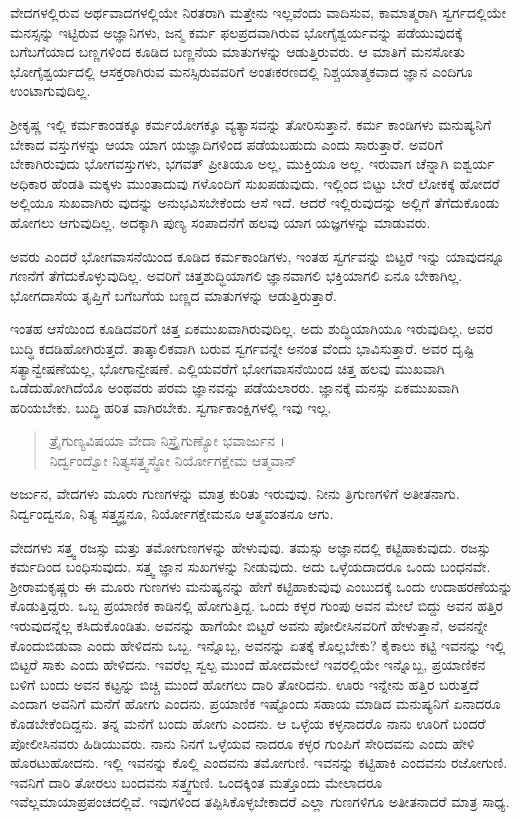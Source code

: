 {\small ವೇದಗಳಲ್ಲಿರುವ ಅರ್ಥವಾದಗಳಲ್ಲಿಯೇ ನಿರತರಾಗಿ ಮತ್ತೇನು ಇಲ್ಲವೆಂದು ವಾದಿಸುವ, ಕಾಮಾತ್ಮರಾಗಿ ಸ್ವರ್ಗದಲ್ಲಿಯೇ ಮನಸ್ಸನ್ನು ಇಟ್ಟಿರುವ ಅಜ್ಞಾನಿಗಳು, ಜನ್ಮ ಕರ್ಮ ಫಲಪ್ರದವಾಗಿರುವ ಭೋಗೈಶ್ವರ್ಯವನ್ನು ಪಡೆಯುವುದಕ್ಕೆ ಬಗೆಬಗೆಯಾದ ಬಣ್ಣಗಳಿಂದ ಕೂಡಿದ ಬಣ್ಣನೆಯ ಮಾತುಗಳನ್ನು ಆಡುತ್ತಿರುವರು. ಆ ಮಾತಿಗೆ ಮನಸೋತು ಭೋಗೈಶ್ವರ್ಯದಲ್ಲಿ ಆಸಕ್ತರಾಗಿರುವ ಮನಸ್ಸಿರುವವರಿಗೆ ಅಂತಃಕರಣದಲ್ಲಿ ನಿಶ್ಚಯಾತ್ಮಕವಾದ ಜ್ಞಾನ ಎಂದಿಗೂ ಉಂಟಾಗುವುದಿಲ್ಲ.}

ಶ್ರೀಕೃಷ್ಣ ಇಲ್ಲಿ ಕರ್ಮಕಾಂಡಕ್ಕೂ ಕರ್ಮಯೋಗಕ್ಕೂ ವ್ಯತ್ಯಾಸವನ್ನು ತೋರಿಸುತ್ತಾನೆ. ಕರ್ಮ ಕಾಂಡಿಗಳು ಮನುಷ್ಯನಿಗೆ ಬೇಕಾದ ವಸ್ತುಗಳನ್ನು ಆಯಾ ಯಾಗ ಯಜ್ಞಾದಿಗಳಿಂದ ಪಡೆಯಬಹುದು ಎಂದು ಸಾರುತ್ತಾರೆ. ಅವರಿಗೆ ಬೇಕಾಗಿರುವುದು ಭೋಗವಸ್ತುಗಳು, ಭಗವತ್ ಪ್ರೀತಿಯೂ ಅಲ್ಲ, ಮುಕ್ತಿಯೂ ಅಲ್ಲ. ಇರುವಾಗ ಚೆನ್ನಾಗಿ ಐಶ್ವರ್ಯ ಅಧಿಕಾರ ಹೆಂಡತಿ ಮಕ್ಕಳು ಮುಂತಾದುವು ಗಳೊಂದಿಗೆ ಸುಖಪಡುವುದು. ಇಲ್ಲಿಂದ ಬಿಟ್ಟು ಬೇರೆ ಲೋಕಕ್ಕೆ ಹೋದರೆ ಅಲ್ಲಿಯೂ ಸುಖವಾಗಿರು ವುದನ್ನು ಅನುಭವಿಸಬೇಕೆಂದು ಆಸೆ ಇದೆ. ಆದರೆ ಇಲ್ಲಿರುವುದನ್ನು ಅಲ್ಲಿಗೆ ತೆಗೆದುಕೊಂಡು ಹೋಗಲು ಆಗುವುದಿಲ್ಲ. ಅದಕ್ಕಾಗಿ ಪುಣ್ಯ ಸಂಪಾದನೆಗೆ ಹಲವು ಯಾಗ ಯಜ್ಞಗಳನ್ನು ಮಾಡುವರು.

ಅವರು ಎಂದರೆ ಭೋಗವಾಸನೆಯಿಂದ ಕೂಡಿದ ಕರ್ಮಕಾಂಡಿಗಳು, ಇಂತಹ ಸ್ವರ್ಗವನ್ನು ಬಿಟ್ಟರೆ ಇನ್ನು ಯಾವುದನ್ನೂ ಗಣನೆಗೆ ತೆಗೆದುಕೊಳ್ಳುವುದಿಲ್ಲ. ಅವರಿಗೆ ಚಿತ್ತಶುದ್ಧಿಯಾಗಲಿ ಜ್ಞಾನವಾಗಲಿ ಭಕ್ತಿಯಾಗಲಿ ಏನೂ ಬೇಕಾಗಿಲ್ಲ. ಭೋಗದಾಸೆಯ ತೃಪ್ತಿಗೆ ಬಗೆಬಗೆಯ ಬಣ್ಣದ ಮಾತುಗಳನ್ನು ಆಡುತ್ತಿರುತ್ತಾರೆ.

ಇಂತಹ ಆಸೆಯಿಂದ ಕೂಡಿದವರಿಗೆ ಚಿತ್ತ ಏಕಮುಖವಾಗಿರುವುದಿಲ್ಲ. ಅದು ಶುದ್ಧಿಯಾಗಿಯೂ ಇರುವುದಿಲ್ಲ. ಅವರ ಬುದ್ಧಿ ಕದಡಿಹೋಗಿರುತ್ತದೆ. ತಾತ್ಕಾಲಿಕವಾಗಿ ಬರುವ ಸ್ವರ್ಗವನ್ನೇ ಅನಂತ ವೆಂದು ಭಾವಿಸುತ್ತಾರೆ. ಅವರ ದೃಷ್ಟಿ ಸತ್ಯಾನ್ವೇಷಣೆಯಲ್ಲ, ಭೋಗಾನ್ವೇಷಣೆ. ಎಲ್ಲಿಯವರೆಗೆ ಭೋಗವಾಸನೆಯಿಂದ ಚಿತ್ತ ಹಲವು ಮುಖವಾಗಿ ಒಡೆದುಹೋಗಿದೆಯೊ ಅಂಥವರು ಪರಮ ಜ್ಞಾನವನ್ನು ಪಡೆಯಲಾರರು. ಜ್ಞಾನಕ್ಕೆ ಮನಸ್ಸು ಏಕಮುಖವಾಗಿ ಹರಿಯಬೇಕು. ಬುದ್ಧಿ ಹರಿತ ವಾಗಿರಬೇಕು. ಸ್ವರ್ಗಾಕಾಂಕ್ಷಿಗಳಲ್ಲಿ ಇವು ಇಲ್ಲ.

\begin{verse}
ತ್ರೈಗುಣ್ಯವಿಷಯಾ ವೇದಾ ನಿಸ್ತ್ರೈಗುಣ್ಯೋ ಭವಾರ್ಜುನ ।\\ನಿರ್ದ್ವಂದ್ವೋ ನಿತ್ಯಸತ್ತ್ವಸ್ಥೋ ನಿರ್ಯೋಗಕ್ಷೇಮ ಆತ್ಮವಾನ್ 
\end{verse}

{\small ಅರ್ಜುನ, ವೇದಗಳು ಮೂರು ಗುಣಗಳನ್ನು ಮಾತ್ರ ಕುರಿತು ಇರುವುವು. ನೀನು ತ್ರಿಗುಣಗಳಿಗೆ ಅತೀತನಾಗು. ನಿರ್ದ್ವಂದ್ವನೂ, ನಿತ್ಯ ಸತ್ತ್ವಸ್ಥನೂ, ನಿರ್ಯೋಗಕ್ಷೇಮನೂ ಆತ್ಮವಂತನೂ ಆಗು.}

ವೇದಗಳು ಸತ್ತ್ವ ರಜಸ್ಸು ಮತ್ತು ತಮೋಗುಣಗಳನ್ನು ಹೇಳುವುವು. ತಮಸ್ಸು ಅಜ್ಞಾನದಲ್ಲಿ ಕಟ್ಟಿಹಾಕುವುದು. ರಜಸ್ಸು ಕರ್ಮದಿಂದ ಬಂಧಿಸುವುದು. ಸತ್ತ್ವ ಜ್ಞಾನ ಸುಖಗಳನ್ನು ನೀಡುವುದು. ಅದು ಒಳ್ಳೆಯದಾದರೂ ಒಂದು ಬಂಧನವೇ. ಶ್ರೀರಾಮಕೃಷ್ಣರು ಈ ಮೂರು ಗುಣಗಳು ಮನುಷ್ಯನನ್ನು ಹೇಗೆ ಕಟ್ಟಿಹಾಕುವುವು ಎಂಬುದಕ್ಕೆ ಒಂದು ಉದಾಹರಣೆಯನ್ನು ಕೊಡುತ್ತಿದ್ದರು. ಒಬ್ಬ ಪ್ರಯಾಣಿಕ ಕಾಡಿನಲ್ಲಿ ಹೋಗುತ್ತಿದ್ದ. ಒಂದು ಕಳ್ಳರ ಗುಂಪು ಅವನ ಮೇಲೆ ಬಿದ್ದು ಅವನ ಹತ್ತಿರ ಇರುವುದನ್ನೆಲ್ಲ ಕಸಿದುಕೊಂಡಿತು. ಅವನನ್ನು ಹಾಗೆಯೇ ಬಿಟ್ಟರೆ ಅವನು ಪೋಲೀಸಿನವರಿಗೆ ಹೇಳುತ್ತಾನೆ, ಅವನನ್ನೇ ಕೊಂದುಬಿಡುವಾ ಎಂದು ಹೇಳಿದನು ಒಬ್ಬ. ಇನ್ನೊಬ್ಬ, ಅವನನ್ನು ಏತಕ್ಕೆ ಕೊಲ್ಲಬೇಕು? ಕೈಕಾಲು ಕಟ್ಟಿ ಇವನನ್ನು ಇಲ್ಲಿ ಬಿಟ್ಟರೆ ಸಾಕು ಎಂದು ಹೇಳಿದನು. ಇವರೆಲ್ಲ ಸ್ವಲ್ಪ ಮುಂದೆ ಹೋದಮೇಲೆ ಇವರಲ್ಲಿಯೇ ಇನ್ನೊಬ್ಬ, ಪ್ರಯಾಣಿಕನ ಬಳಿಗೆ ಬಂದು ಅವನ ಕಟ್ಟನ್ನು ಬಿಚ್ಚಿ ಮುಂದೆ ಹೋಗಲು ದಾರಿ ತೋರಿದನು. ಊರು ಇನ್ನೇನು ಹತ್ತಿರ ಬರುತ್ತದೆ ಎಂದಾಗ ಅವನಿಗೆ ಮನೆಗೆ ಹೋಗು ಎಂದನು. ಪ್ರಯಾಣಿಕ ಇಷ್ಟೊಂದು ಸಹಾಯ ಮಾಡಿದ ಮನುಷ್ಯನಿಗೆ ಏನಾದರೂ ಕೊಡಬೇಕೆಂದಿದ್ದನು. ತನ್ನ ಮನೆಗೆ ಬಂದು ಹೋಗು ಎಂದನು. ಆ ಒಳ್ಳೆಯ ಕಳ್ಳನಾದರೊ ನಾನು ಊರಿಗೆ ಬಂದರೆ ಪೋಲೀಸಿನವರು ಹಿಡಿಯುವರು. ನಾನು ನಿನಗೆ ಒಳ್ಳೆಯವ ನಾದರೂ ಕಳ್ಳರ ಗುಂಪಿಗೆ ಸೇರಿದವನು ಎಂದು ಹೇಳಿ ಹೊರಟುಹೋದನು. ಇಲ್ಲಿ ಇವನನ್ನು ಕೊಲ್ಲಿ ಎಂದವನು ತಮೋಗುಣಿ. ಇವನನ್ನು ಕಟ್ಟಿಹಾಕಿ ಎಂದವನು ರಜೋಗುಣಿ. ಇವನಿಗೆ ದಾರಿ ತೋರಲು ಬಂದವನು ಸತ್ತ್ವಗುಣಿ. ಒಂದಕ್ಕಿಂತ ಮತ್ತೊಂದು ಮೇಲಾದರೂ ಇವೆಲ್ಲಮಾಯಾಪ್ರಪಂಚದಲ್ಲಿವೆ. ಇವುಗಳಿಂದ ತಪ್ಪಿಸಿಕೊಳ್ಳಬೇಕಾದರೆ ಎಲ್ಲಾ ಗುಣಗಳಿಗೂ ಅತೀತನಾದರೆ ಮಾತ್ರ ಸಾಧ್ಯ.

